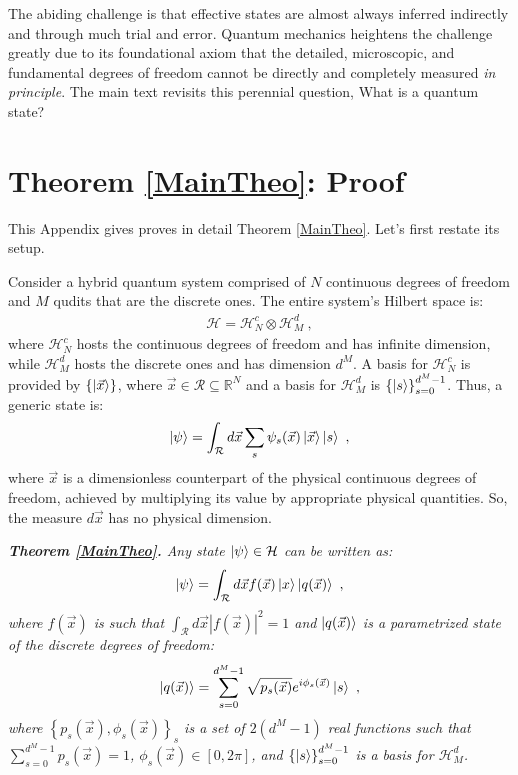 \documentclass[draft,nofootinbib,pre,twocolumn,showpacs,showkeys,preprintnumbers,floatfix]{revtex4-1}
\newcommand{\1}{\mathbbm{1}}
\begin{document}
The abiding challenge is that effective states are almost always inferred
indirectly and through much trial and error. Quantum mechanics heightens the
challenge greatly due to its foundational axiom that the detailed, microscopic,
and fundamental degrees of freedom cannot be directly and completely measured
\emph{in principle}. The main text revisits this perennial question, What is a
quantum state?

\section{Theorem \ref{MainTheo}: Proof}
\label{sm:MainTheo}

This Appendix gives proves in detail Theorem \ref{MainTheo}.
Let's first restate its setup.

Consider a hybrid quantum system comprised of $N$ continuous degrees of freedom
and $M$ qudits that are the discrete ones. The entire system's Hilbert space
is:
\begin{align*}
\mathcal{H} = \mathcal{H}^c_N \otimes \mathcal{H}^d_M
  ~,
\end{align*}
where $\mathcal{H}_N^c$ hosts the continuous degrees of freedom and has
infinite dimension, while $\mathcal{H}^d_M$ hosts the discrete ones and has
dimension $d^M$. A basis for $\mathcal{H}_N^c$ is provided by
$\left\{\ket{\vec{x}}\right\}$, where $\vec{x} \in \mathcal{R} \subseteq
\mathbb{R}^N$ and a basis for $\mathcal{H}_M^d$ is
$\left\{\ket{s}\right\}_{s=0}^{d^M-1}$. Thus, a generic state is:
\begin{align}
\ket{\psi} = \int_{\mathcal{R}} d\vec{x} \sum_{s} \psi_s(\vec{x})\ket{\vec{x}} \ket{s}
  ~,\label{eq:first_step}
\end{align}
where $\vec{x}$ is a dimensionless counterpart of the physical continuous
degrees of freedom, achieved by multiplying its value by appropriate physical
quantities. So, the measure $d\vec{x}$ has no physical dimension. 


\emph{{\bf Theorem \ref{MainTheo}.}
Any state $\ket{\psi} \in \mathcal{H}$ can be written as:
\begin{align*}
\ket{\psi} = \int_{\mathcal{R}}d\vec{x} f(\vec{x}) \ket{x}\ket{q(\vec{x})}
  ~,
\end{align*}
where $f(\vec{x})$ is such that $\int_{\mathcal{R}}d\vec{x} |f(\vec{x})|^2 = 1$
and $\ket{q(\vec{x})}$ is a parametrized state of the discrete degrees of
freedom:
\begin{align*}
\ket{q(\vec{x})}
  = \sum_{s=0}^{d^M-1} \sqrt{p_s(\vec{x})} e^{i\phi_s(\vec{x})} \ket{s}
  ~,
\end{align*}
where $\left\{ p_s(\vec{x}),\phi_s(\vec{x})\right\}_s$ is a set of $2(d^M-1)$
real functions such that $\sum_{s=0}^{d^M-1} p_s(\vec{x}) = 1$,
$\phi_s(\vec{x}) \in [0,2\pi]$, and $\left\{\ket{s}\right\}_{s=0}^{d^M-1}$ is a
basis for $\mathcal{H}_M^d$.
}
\end{document}
